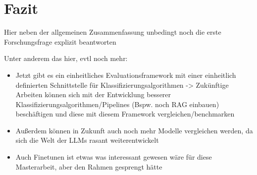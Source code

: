 \chapter{Fazit}\label{ch:fazit}

Hier neben der allgemeinen Zusammenfassung unbedingt noch die erste Forschungsfrage explizit beantworten

Unter anderem das hier, evtl noch mehr:
\begin{itemize}
    \item Jetzt gibt es ein einheitliches Evaluationsframework mit einer einheitlich definierten Schnittstelle für Klassifizierungsalgorithmen -> Zukünftige Arbeiten können sich mit der Entwicklung besserer Klassifizierungsalgorithmen/Pipelines (Bspw. noch RAG einbauen) beschäftigen und diese mit diesem Framework vergleichen/benchmarken
    \item Außerdem können in Zukunft auch noch mehr Modelle vergleichen werden, da sich die Welt der LLMs rasant weiterentwickelt
    \item Auch Finetunen ist etwas was interessant gewesen wäre für diese Masterarbeit, aber den Rahmen gesprengt hätte
\end{itemize}